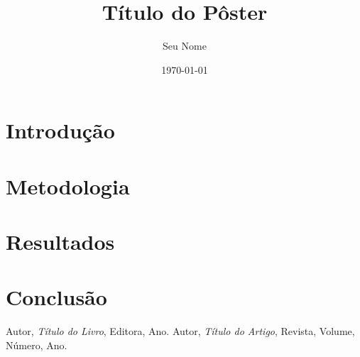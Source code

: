 \documentclass[a0,landscape]{a0poster}
\title{Título do Pôster}
\author{Seu Nome}
\date{\today}
\begin{document}
\maketitle

\begin{abstract}
\lipsum[1]
\end{abstract}

\section{Introdução}
\lipsum[2-3]

\section{Metodologia}
\lipsum[4-5]

\section{Resultados}
\lipsum[6-7]

\section{Conclusão}
\lipsum[8]

\begin{thebibliography}{9}
 Autor, \textit{Título do Livro}, Editora, Ano.
 Autor, \textit{Título do Artigo}, Revista, Volume, Número, Ano.
\end{thebibliography}
\end{document}
